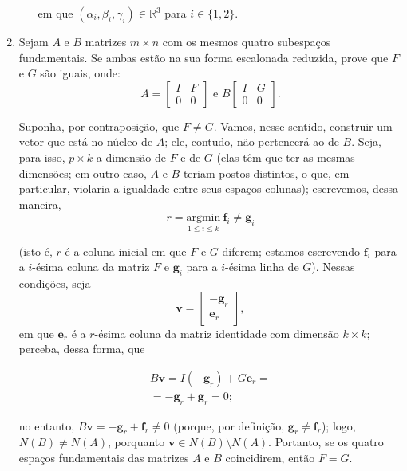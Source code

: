 \documentclass[leqno]{article}
\begin{document}
\begin{enumerate}
\begin{enumerate}
\begin{sol}
		\noindent em que $(\alpha_{i}, \beta_{i}, \gamma_{i}) \in \mathbb{R}^{3}$ para $i \in \{1, 2\}$.  
	\end{sol} 
\end{enumerate}

\item Sejam $A$ e $B$ matrizes $m \times n$ com os mesmos quatro subespaços fundamentais. Se ambas estão na sua forma escalonada reduzida, prove que $F$ e $G$ são iguais, onde:
$$A = \begin{bmatrix}
I & F \\
0 & 0
\end{bmatrix} \mbox{ e } B \begin{bmatrix}
I & G \\
0 & 0
\end{bmatrix}.$$

\begin{sol} 
	Suponha, por contraposição, que $F \neq G$. Vamos, nesse sentido, construir um vetor que está no núcleo de $A$; ele, contudo, não pertencerá ao de $B$. Seja, para isso, $p \times k$ a dimensão de $F$ e de $G$ (elas têm que ter as mesmas dimensões; em outro caso, $A$ e $B$ teriam postos distintos, o que, em particular, violaria a igualdade entre seus espaços colunas); escrevemos, dessa maneira, 
	\begin{equation*} 
		r = \underset{1 \le i \le k}{\mathrm{arg min}} \ \mathbf{f}_{i} \neq \mathbf{g}_{i} 
	\end{equation*} 

	\noindent (isto é, $r$ é a coluna inicial em que $F$ e $G$ diferem; estamos escrevendo $\mathbf{f}_{i}$ para a $i$-ésima coluna da matriz $F$ e $\mathbf{g}_{i}$ para a $i$-ésima linha de $G$). Nessas condições, seja 
	\begin{equation*} 
		\mathbf{v} = 
		\begin{bmatrix} 
			-\mathbf{g}_{r} \\ 
			\mathbf{e}_{r} 
		\end{bmatrix}, 
	\end{equation*} 
	\noindent em que $\mathbf{e}_{r}$ é a $r$-ésima coluna da matriz identidade com dimensão $k \times k$; perceba, dessa forma, que 

	\begin{equation*} 
		\begin{split} 
			B\mathbf{v} = I(-\mathbf{g}_{r}) + G\mathbf{e}_{r} = \\ 
			= -\mathbf{g}_{r} + \mathbf{g}_{r} = 0; 
		\end{split}    
	\end{equation*} 

	\noindent no entanto, $B\mathbf{v} = -\mathbf{g}_{r} + \mathbf{f}_{r} \neq 0$ (porque, por definição, $\mathbf{g}_{r} \neq \mathbf{f}_{r}$); logo, $N(B) \neq N(A)$, porquanto $\mathbf{v} \in N(B)\setminus N(A)$. Portanto, se os quatro espaços fundamentais das matrizes $A$ e $B$ coincidirem, então $F = G$.   
\end{sol} 
\end{enumerate}
\end{document}
